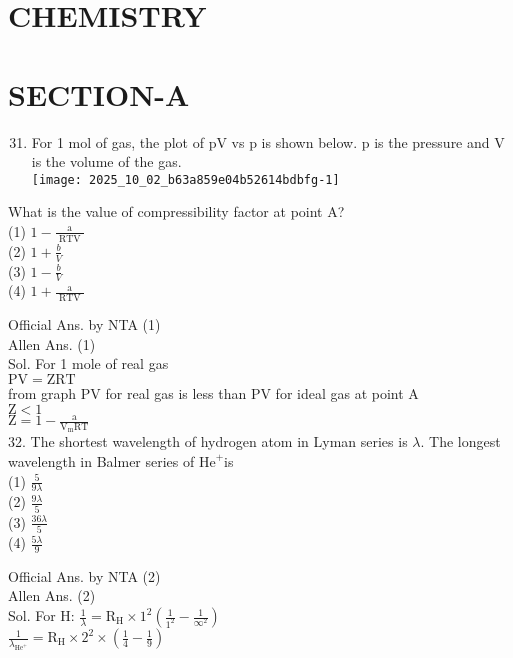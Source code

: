\documentclass[10pt]{article}
\begin{document}
\section*{CHEMISTRY}
\section*{SECTION-A}
\begin{enumerate}
  \setcounter{enumi}{30}
  \item For 1 mol of gas, the plot of pV vs p is shown below. p is the pressure and V is the volume of the gas.\\
\texttt{[image: 2025\_10\_02\_b63a859e04b52614bdbfg-1]}
\end{enumerate}

What is the value of compressibility factor at point A?\\
(1) \(1-\frac{\mathrm{a}}{\text { RTV }}\)\\
(2) \(1+\frac{b}{V}\)\\
(3) \(1-\frac{b}{V}\)\\
(4) \(1+\frac{\mathrm{a}}{\text { RTV }}\)

Official Ans. by NTA (1)\\
Allen Ans. (1)\\
Sol. For 1 mole of real gas\\
\(\mathrm{PV}=\mathrm{ZRT}\)\\
from graph PV for real gas is less than PV for ideal gas at point A\\
\(\mathrm{Z}<1\)\\
\(\mathrm{Z}=1-\frac{\mathrm{a}}{\mathrm{V}_{\mathrm{m}} \mathrm{RT}}\)\\
32. The shortest wavelength of hydrogen atom in Lyman series is \(\lambda\). The longest wavelength in Balmer series of \(\mathrm{He}^{+}\)is\\
(1) \(\frac{5}{9 \lambda}\)\\
(2) \(\frac{9 \lambda}{5}\)\\
(3) \(\frac{36 \lambda}{5}\)\\
(4) \(\frac{5 \lambda}{9}\)

Official Ans. by NTA (2)\\
Allen Ans. (2)\\
Sol. For H: \(\frac{1}{\lambda}=\mathrm{R}_{\mathrm{H}} \times 1^{2}\left(\frac{1}{1^{2}}-\frac{1}{\infty^{2}}\right)\)\\
\(\frac{1}{\lambda_{\mathrm{He}^{+}}}=\mathrm{R}_{\mathrm{H}} \times 2^{2} \times\left(\frac{1}{4}-\frac{1}{9}\right)\)
\end{document}

